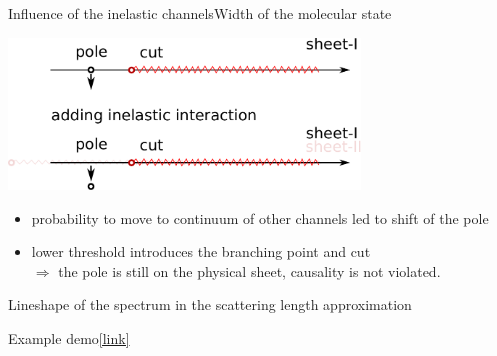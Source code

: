 \documentclass[aspectratio=169]{beamer}
\begin{document}
\begin{frame}{Influence of the inelastic channels}{Width of the molecular state}
    \begin{center}
        \includegraphics[width=0.7\textwidth]{figs/PcJPAC/pole_cut_inelastic.pdf}
    \end{center}
    \begin{itemize}
        \item probability to move to continuum of other channels led to shift of the pole
        \item lower threshold introduces the branching point and cut\\
        $\Rightarrow$ the pole is still on the physical sheet, causality is not violated.
    \end{itemize}
\end{frame}

\begin{frame}{Lineshape of the spectrum in the scattering length approximation}
\begin{center}
    \Huge Example demo\quad\href{https://hub-binder.mybinder.ovh/user/mmikhasenko-201-rons-manchester-j8y5l8kk/apps/Examples/lineshape_and_poleposition_in_SLA.ipynb}{\color{orange}[link]}\\[1cm]
    \qquad
    \\
\end{center}
\end{frame}
\end{document}
